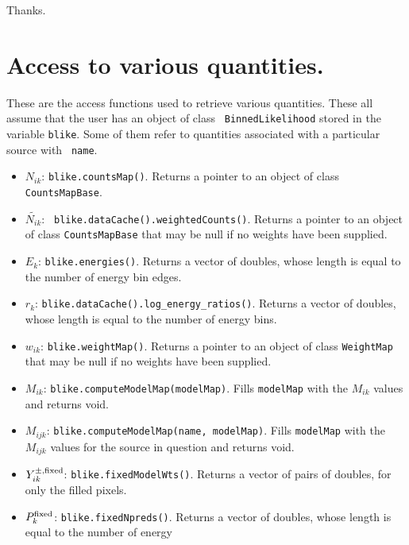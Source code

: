 \documentclass[preprint]{aastex}
\begin{document}
\begin{acknowledgements}
  Thanks.
\end{acknowledgements}

%

\appendix

\section{Access to various quantities.}\label{app:access}

These are the access functions used to retrieve various quantities.
These all assume that the user has an object of class {\tt
  BinnedLikelihood} stored in the variable {\tt blike}.  Some of them
refer to quantities associated with a particular source with {\tt
  name}.

\begin{itemize}
\item{ {\bf $N_{ik}$}: {\tt blike.countsMap()}. Returns a pointer
    to an object of class {\tt CountsMapBase}.}
\item{ {\bf $\tilde{N_{ik}}$}: {\tt
      blike.dataCache().weightedCounts()}.  Returns a pointer to
    an object of class {\tt CountsMapBase} that may be null if no
    weights have been supplied.}
\item{ {\bf $E_k$}: {\tt blike.energies()}. Returns a vector of
    doubles, whose length is equal to the number of energy bin edges.}
\item{ {\bf $r_{k}$}: {\tt blike.dataCache().log\_energy\_ratios()}.
    Returns a vector of doubles, whose length is equal to the
    number of energy bins.}
\item{ {\bf $w_{ik}$}: {\tt blike.weightMap()}.  Returns a
    pointer to an object of class {\tt WeightMap} that may be null if
    no weights have been supplied.}
\item{ {\bf $M_{ik}$}: {\tt blike.computeModelMap(modelMap)}.  Fills
    {\tt modelMap} with the $M_{ik}$ values and returns void.}
\item{ {\bf $M_{ijk}$}: {\tt blike.computeModelMap(name,
      modelMap)}.  Fills {\tt modelMap} with the $M_{ijk}$ values
    for the source in question and returns void.}
\item{ {\bf $Y_{ik}^{\pm,\rm fixed}$}: {\tt blike.fixedModelWts()}.
    Returns a vector of pairs of doubles, for only the filled pixels.}
\item{ {\bf $P_{k}^{\rm fixed}$}: {\tt blike.fixedNpreds()}.  Returns
    a vector of doubles, whose length is equal to the number of energy
}
\end{itemize}
\end{document}
